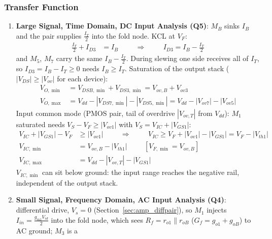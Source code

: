 \subsubsection{Transfer Function}
\begin{enumerate}
  \item \textbf{Large Signal, Time Domain, DC Input Analysis (Q5)}:
    \(M_B\) sinks \(I_B\) and the pair supplies \(\frac{I_T}{2}\) into the fold node.
    KCL at \(V_F\):
    \begin{align*}
      \frac{I_T}{2} + I_{D3} &= I_B \hspace{1cm} \Rightarrow \hspace{1cm} I_{D3} = I_B - \frac{I_T}{2}
    \end{align*}
    and \(M_5\), \(M_7\) carry the same \(I_B - \frac{I_T}{2}\). During slewing one side
    receives all of \(I_T\), so \(I_{D3} = I_B - I_T \geq 0\) needs \(I_B \geq I_T\).
    Saturation of the output stack (\(|V_{DS}| \geq |V_{ov}|\) for each device):
    \begin{align*}
      V_{O,\min} &= V_{DSB,\min} + V_{DS3,\min} = V_{ov,B} + V_{ov3} \\
      V_{O,\max} &= V_{dd} - |V_{DS7,\min}| - |V_{DS5,\min}| = V_{dd} - |V_{ov7}| - |V_{ov5}|
    \end{align*}
    Input common mode (PMOS pair, tail of overdrive \(|V_{ov,T}|\) from \(V_{dd}\)):
    \(M_1\) saturated needs \(V_S - V_F \geq |V_{ov1}|\) with \(V_S = V_{IC} + |V_{GS1}|\):
    \begin{align*}
      V_{IC} + |V_{GS1}| - V_F &\geq |V_{ov1}| \hspace{1cm} \Rightarrow \hspace{1cm} V_{IC} \geq V_F + |V_{ov1}| - |V_{GS1}| = V_F - |V_{th1}| \\
      V_{IC,\min} &= V_{ov,B} - |V_{th1}| \hspace{1cm} [V_{F,\min} = V_{ov,B}] \\
      V_{IC,\max} &= V_{dd} - |V_{ov,T}| - |V_{GS1}|
    \end{align*}
    \(V_{IC,\min}\) can sit below ground: the input range reaches the
    negative rail, independent of the output stack.
  \item \textbf{Small Signal, Frequency Domain, AC Input Analysis (Q4)}:
    differential drive, \(V_s = 0\) (Section~\ref{sec:amp_diffpair}), so \(M_1\)
    injects \(I_{in} = \frac{g_{m1} V_{id}}{2}\) into the fold node, which sees
    \(R_f = r_{o1} \parallel r_{oB}\) (\(G_f = g_{o1} + g_{oB}\)) to AC ground; \(M_3\) is a

\end{enumerate}
